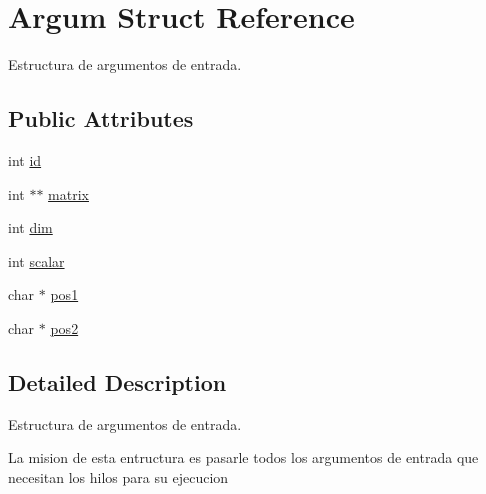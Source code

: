 \hypertarget{structArgum}{\section{Argum Struct Reference}
\label{structArgum}
}


Estructura de argumentos de entrada.  


\subsection*{Public Attributes}
\begin{DoxyCompactItemize}
\item 
int \hyperlink{structArgum_a1e19639236d672db337655913280c502}{id}
\item 
int $\ast$$\ast$ \hyperlink{structArgum_a5e62bf7d3af611b48cdeed5decdf47be}{matrix}
\item 
int \hyperlink{structArgum_a69c560b91efcd6709b891e9a7fd204bd}{dim}
\item 
int \hyperlink{structArgum_a8f60de19f057d334f365ec7ef21d7439}{scalar}
\item 
char $\ast$ \hyperlink{structArgum_a6ba39122df5e87923c854fdb415b37af}{pos1}
\item 
char $\ast$ \hyperlink{structArgum_a69aaf9b57d62f8704a7f83afaca5d361}{pos2}
\end{DoxyCompactItemize}


\subsection{Detailed Description}
Estructura de argumentos de entrada. 

La mision de esta entructura es pasarle todos los argumentos de entrada que necesitan los hilos para su ejecucion 

